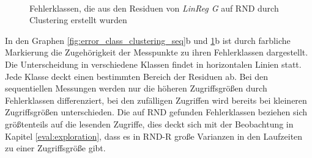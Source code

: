 \documentclass[
	12pt,
	a4paper,
	BCOR10mm,
	DIV14,
	listof=totoc,
	bibliography=totoc,
	headsepline
]{scrreprt}
\begin{document}
\begin{figure}
	\centering
	\hfill
	\\
	\hfill
	\vspace*{-0.3cm}
	\caption{Fehlerklassen, die aus den Residuen von \textit{LinReg G} auf RND durch Clustering erstellt wurden}
	\label{fig:error_class_clustering_rnd}
\end{figure} \medskip

In den Graphen \ref{fig:error_class_clustering_seq}b und \ref{fig:error_class_clustering_rnd}b ist durch farbliche Markierung die Zugehörigkeit der Messpunkte zu ihren Fehlerklassen dargestellt.
Die Unterscheidung in verschiedene Klassen findet in horizontalen Linien statt.
Jede Klasse deckt einen bestimmten Bereich der Residuen ab.
Bei den sequentiellen Messungen werden nur die höheren Zugriffsgrößen durch Fehlerklassen differenziert, bei den zufälligen Zugriffen wird bereits bei kleineren Zugriffsgrößen unterschieden. Die auf RND gefunden Fehlerklassen beziehen sich größtenteils auf die lesenden Zugriffe, dies deckt sich mit der Beobachtung in Kapitel \ref{eval:exploration}, dass es in RND-R große Varianzen in den Laufzeiten zu einer Zugriffsgröße gibt.\medskip
\end{document}
